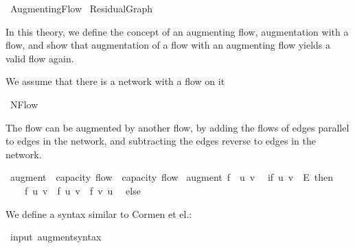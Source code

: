 %
\begin{isabellebody}%
%
%
\isamarkuptrue%
%
\isadelimtheory
%
\endisadelimtheory
%
\isatagtheory
{}\isamarkupfalse%
\ Augmenting{\isacharunderscore}Flow\isanewline
{}\ Residual{\isacharunderscore}Graph\isanewline
{}%
\endisatagtheory
{\isafoldtheory}%
%
\isadelimtheory
%
\endisadelimtheory
%
\begin{isamarkuptext}%
In this theory, we define the concept of an augmenting flow,
  augmentation with a flow, and show that augmentation of a flow 
  with an augmenting flow yields a valid flow again.%
\end{isamarkuptext}\isamarkuptrue%
%
\begin{isamarkuptext}%
We assume that there is a network with a flow  on it%
\end{isamarkuptext}\isamarkuptrue%
\isamarkupfalse%
\ NFlow\isanewline
{}%
\isamarkuptrue%
%
\begin{isamarkuptext}%
The flow can be augmented by another flow, by adding the flows 
  of edges parallel to edges in the network, and subtracting the edges 
  reverse to edges in the network.%
\end{isamarkuptext}\isamarkuptrue%
\isamarkupfalse%
\ augment\ {\isacharcolon}{\isacharcolon}\ {\isachardoublequoteopen}{\isacharprime}capacity\ flow\ {\isasymRightarrow}\ {\isacharprime}capacity\ flow{\isachardoublequoteclose}\isanewline
{}\ {\isachardoublequoteopen}augment\ f{\isacharprime}\ {\isasymequiv}\ {\isasymlambda}{\isacharparenleft}u{\isacharcomma}\ v{\isacharparenright}{\isachardot}\isanewline
\ \ if\ {\isacharparenleft}u{\isacharcomma}\ v{\isacharparenright}\ {\isasymin}\ E\ then\isanewline
\ \ \ \ f\ {\isacharparenleft}u{\isacharcomma}\ v{\isacharparenright}\ {\isacharplus}\ f{\isacharprime}\ {\isacharparenleft}u{\isacharcomma}\ v{\isacharparenright}\ {\isacharminus}\ f{\isacharprime}\ {\isacharparenleft}v{\isacharcomma}\ u{\isacharparenright}\isanewline
\ \ else\isanewline
\ \ \ \ {}{\isachardoublequoteclose}%
\begin{isamarkuptext}%
We define a syntax similar to Cormen et el.:%
\end{isamarkuptext}\isamarkuptrue%
\isamarkupfalse%
\ {\isacharparenleft}input{\isacharparenright}\ augment{\isacharunderscore}syntax\ {\isacharparenleft}\ {\isachardoublequoteopen}{\isasymup}{\isachardoublequoteclose}\ {}{}{\isacharparenright}\ \isanewline

\end{isabellebody}
